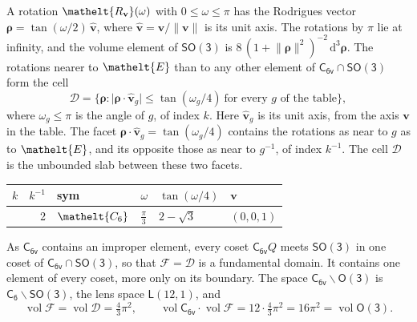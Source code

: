 \documentclass[10pt,a4paper]{article}
\numberwithin{equation}{section}
\newcommand{\eltfont}[1]{{\let\sigma\eltsigma\mathelt{#1}}}
\newcommand{\grp}[1]{\mathsf{#1}}
\newcommand{\cls}[1]{\eltfont{#1}}
\newcommand{\elt}[1]{\eltfont{#1}}
\newcommand{\dirvec}[3]{(#1, #2, #3)}
\newcommand{\unitaxis}{\hat{\mathbf{v}}}
\newcommand{\vv}{\mathbf{v}}
\newcommand{\diff}{\mathrm{d}}
\newcommand{\vol}{\operatorname{vol}}
\newcommand{\rodrigues}{\boldsymbol{\rho}}
\newcommand{\fcell}{\mathcal{D}}
\newcommand{\fdomain}{\mathcal{F}}
\newcommand{\lensspace}[2]{\mathsf{L}(#1, #2)}
\begin{document}
\leavevmode\label{n:vector.rodrigues}\label{n:vector.unitaxis}A rotation $\elt{R_{\vv}}(\omega)$ with $0 \le \omega \le \pi$ has the Rodrigues vector $\rodrigues = \tan(\omega/2)\,\unitaxis$, where $\unitaxis = \vv/\lVert\vv\rVert$ is its unit axis. The rotations by $\pi$ lie at infinity, and the volume element of \href{SO3.pdf}{$\grp{SO(3)}$} is $8\,(1 + \lVert\rodrigues\rVert^2)^{-2}\,\diff^3\rodrigues$.
\leavevmode\label{n:set.cell}The rotations nearer to $\elt{E}$ than to any other element of $\grp{C_{6v}} \cap \grp{SO(3)}$ form the cell
\begin{equation}\label{e:cell}\fcell = \bigl\{\rodrigues : \lvert\rodrigues\cdot\unitaxis_g\rvert \le \tan(\omega_g/4)\ \text{for every $g$ of the table}\bigr\},\end{equation}
where $\omega_g \le \pi$ is the angle of $g$, of index $k$. Here $\unitaxis_g$ is its unit axis, from the axis $\vv$ in the table. The facet $\rodrigues\cdot\unitaxis_g = \tan(\omega_g/4)$ contains the rotations as near to $g$ as to $\elt{E}$, and its opposite those as near to $g^{-1}$, of index $k^{-1}$. The cell $\fcell$ is the unbounded slab between these two facets.
{\small{\renewcommand{\arraystretch}{1.3}\begin{longtable}{@{}rrllll@{}}\toprule
$k$ & $k^{-1}$ & sym & $\omega$ & $\tan(\omega/4)$ & $\vv$\\\midrule\endhead
\bottomrule\endfoot\endlastfoot
1 & 2 & $\cls{C_{6}}$ & $\tfrac{\pi}{3}$ & $2 - \sqrt{3}$ & $\dirvec{0}{0}{1}$\\
\bottomrule\end{longtable}}}

\leavevmode\label{n:set.fundamental}As $\grp{C_{6v}}$ contains an improper element, every coset $\grp{C_{6v}}Q$ meets \href{SO3.pdf}{$\grp{SO(3)}$} in one coset of $\grp{C_{6v}} \cap \grp{SO(3)}$, so that $\fdomain = \fcell$ is a fundamental domain. It contains one element of every coset, more only on its boundary.
\leavevmode\label{n:set.lens}The space $\grp{C_{6v}}\backslash\grp{O(3)}$ is $\grp{C_{6}}\backslash\grp{SO(3)}$, the lens space $\lensspace{12}{1}$, and
\begin{equation}\label{e:volume}\vol\fdomain = \vol\fcell = \tfrac{4}{3}\pi^2,\qquad \vol\grp{C_{6v}}\cdot\vol\fdomain = 12\cdot \tfrac{4}{3}\pi^2 = 16\pi^2 = \vol\grp{O(3)}.\end{equation}
\end{document}
